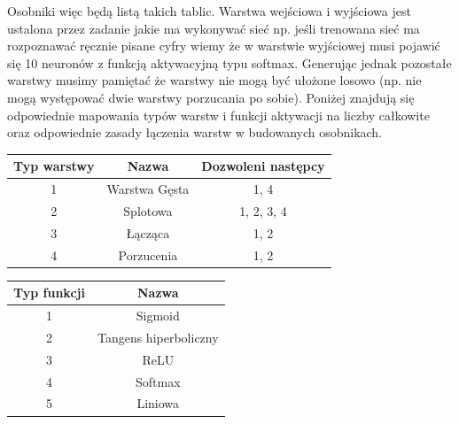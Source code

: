 \documentclass{article}
\begin{document}
Osobniki więc będą listą takich tablic.
Warstwa wejściowa i wyjściowa jest ustalona 
przez zadanie jakie ma wykonywać sieć np. jeśli trenowana sieć ma rozpoznawać ręcznie pisane
cyfry wiemy że w warstwie  wyjściowej musi pojawić się 10 neuronów z funkcją aktywacyjną
typu softmax.
Generując jednak pozostałe warstwy musimy pamiętać że warstwy nie mogą być ułożone losowo
(np. nie mogą występować dwie warstwy porzucania po sobie). Poniżej znajdują się odpowiednie
mapowania typów warstw i funkcji aktywacji na liczby całkowite oraz odpowiednie zasady 
łączenia warstw w budowanych osobnikach.
\begin{tabular}{|c|c|c|}
	\hline
	Typ warstwy & Nazwa & Dozwoleni następcy \\
	\hline
	1 & Warstwa Gęsta & 1, 4\\
	2 & Splotowa & 1, 2, 3, 4\\
	3 & Łącząca & 1, 2\\
	4 & Porzucenia & 1, 2 \\
	\hline
\end{tabular}
\quad
\begin{tabular}{|c|c|}
	\hline
	Typ funkcji & Nazwa\\
	\hline
	1 & Sigmoid \\
	2 & Tangens hiperboliczny \\
	3 & ReLU \\
	4 & Softmax \\
	5 & Liniowa \\
	\hline
\end{tabular}
\end{document}
